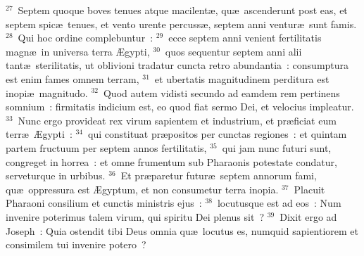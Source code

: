 ${}^{27}$~Septem quoque boves tenues atque macilent\ae , qu\ae\ ascenderunt post eas, et septem spic\ae\ tenues, et vento urente percuss\ae , septem anni ventur\ae\ sunt famis.
${}^{28}$~Qui hoc ordine complebuntur~:
${}^{29}$~ecce septem anni venient fertilitatis magn\ae\ in universa terra \AE gypti,
${}^{30}$~quos sequentur septem anni alii tant\ae\ sterilitatis, ut oblivioni tradatur cuncta retro abundantia~: consumptura est enim fames omnem terram,
${}^{31}$~et ubertatis magnitudinem perditura est inopi\ae\ magnitudo.
${}^{32}$~Quod autem vidisti secundo ad eamdem rem pertinens somnium~: firmitatis indicium est, eo quod fiat sermo Dei, et velocius impleatur.
${}^{33}$~Nunc ergo provideat rex virum sapientem et industrium, et pr\ae ficiat eum terr\ae\ \AE gypti~:
${}^{34}$~qui constituat pr\ae positos per cunctas regiones~: et quintam partem fructuum per septem annos fertilitatis,
${}^{35}$~qui jam nunc futuri sunt, congreget in horrea~: et omne frumentum sub Pharaonis potestate condatur, serveturque in urbibus.
${}^{36}$~Et pr\ae paretur futur\ae\ septem annorum fami, qu\ae\ oppressura est \AE gyptum, et non consumetur terra inopia.
${}^{37}$~Placuit Pharaoni consilium et cunctis ministris ejus~:
${}^{38}$~locutusque est ad eos~: Num invenire poterimus talem virum, qui spiritu Dei plenus sit~?
${}^{39}$~Dixit ergo ad Joseph~: Quia ostendit tibi Deus omnia qu\ae\ locutus es, numquid sapientiorem et consimilem tui invenire potero~?


